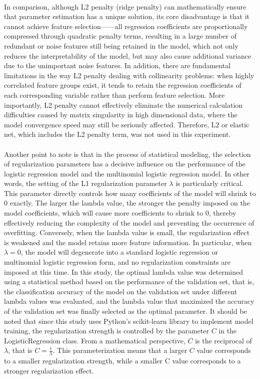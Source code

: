 \\
In comparison, although L2 penalty (ridge penalty) can mathematically ensure that parameter estimation has a unique solution, its core disadvantage is that it cannot achieve feature selection——all regression coefficients are proportionally compressed through quadratic penalty terms, resulting in a large number of redundant or noise features still being retained in the model, which not only reduces the interpretability of the model, but may also cause additional variance due to the unimportant noise features. In addition, there are fundamental limitations in the way L2 penalty dealing with collinearity problems: when highly correlated feature groups exist, it tends to retain the regression coefficients of each corresponding variable rather than perform feature selection. More importantly, L2 penalty cannot effectively eliminate the numerical calculation difficulties caused by matrix singularity in high dimensional data, where the model convergence speed may still be seriously affected. Therefore, L2 or elastic net, which includes the L2 penalty term, was not used in this experiment.\\
\\
Another point to note is that in the process of statistical modeling, the selection of regularization parameters has a decisive influence on the performance of the logistic regression model and the multinomial logistic regression model. In other words, the setting of the L1 regularization parameter $\lambda$ is particularly critical. This parameter directly controls how many coefficients of the model will shrink to 0 exactly. The larger the lambda value, the stronger the penalty imposed on the model coefficients, which will cause more coefficients to shrink to 0, thereby effectively reducing the complexity of the model and preventing the occurrence of overfitting. Conversely, when the lambda value is small, the regularization effect is weakened and the model retains more feature information. In particular, when $\lambda=0$, the model will degenerate into a standard logistic regression or multinomial logistic regression form, and no regularization constraints are imposed at this time. In this study, the optimal lambda value was determined using a statistical method based on the performance of the validation set, that is, the classification accuracy of the model on the validation set under different lambda values was evaluated, and the lambda value that maximized the accuracy of the validation set was finally selected as the optimal parameter. It should be noted that since this study uses Python's scikit-learn library to implement model training, the regularization strength is controlled by the parameter $C$ in the LogisticRegression class. From a mathematical perspective, $C$ is the reciprocal of $\lambda$, that is $C=\frac{1}{\lambda}$. This parameterization means that a larger $C$ value corresponds to a smaller regularization strength, while a smaller C value corresponds to a stronger regularization effect.\\
